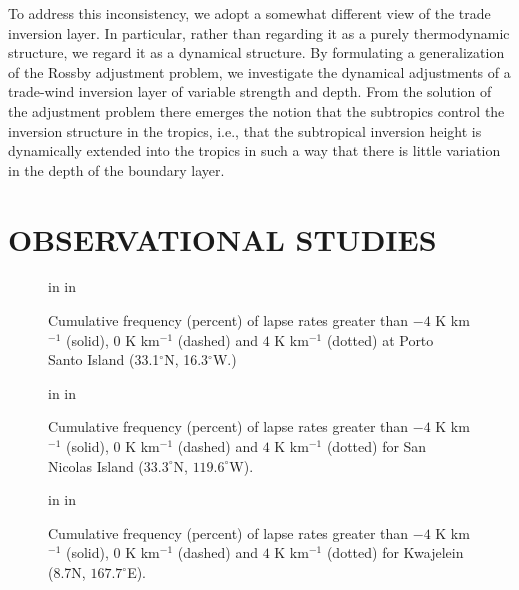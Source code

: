 To address this inconsistency, we adopt a somewhat different
view of the trade inversion layer.  In particular, rather than regarding it as
a purely thermodynamic structure, we regard it as a dynamical structure.  By
formulating a generalization of the Rossby adjustment problem, we investigate
the dynamical adjustments of a trade-wind inversion layer of variable strength
and depth.  From the solution of the adjustment problem there emerges the
notion that the subtropics control the inversion structure in the tropics,
i.e., that the subtropical inversion height is dynamically extended into the
tropics in such a way that there is little variation in the depth of the
boundary layer.

\section{OBSERVATIONAL STUDIES}

\begin{figure}[t]

\centerline{
 in
 in
}

\caption{Cumulative frequency (percent) of lapse rates greater than $-4$ K
km$^{-1}$ (solid), $0$ K km$^{-1}$ (dashed) and $4$ K km$^{-1}$
(dotted) at Porto Santo Island (33.1$^\circ$N, 16.3$^\circ$W.)}

\end{figure}

\begin{figure}[t]

\centerline{
 in
 in
}

\caption{Cumulative frequency (percent) of lapse rates greater than $-4$ K
km$^{-1}$ (solid), $0$ K km$^{-1}$ (dashed) and $4$ K km$^{-1}$
(dotted) for San Nicolas Island ($33.3^\circ$N, $119.6^\circ$W).}

\end{figure}

\begin{figure}[t]

\centerline{
 in
 in
}

\caption{Cumulative frequency (percent) of lapse rates greater than $-4$ K
km$^{-1}$ (solid), $0$ K km$^{-1}$ (dashed) and $4$ K km$^{-1}$
(dotted) for Kwajelein (8.7N, $167.7^\circ$E).}

\end{figure}

